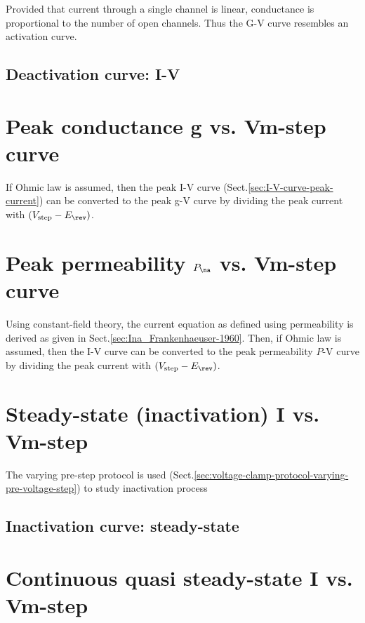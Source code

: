 Provided that current through a single channel is linear, conductance is
proportional to the number of open channels. Thus the G-V curve resembles an
activation curve.

\subsection{Deactivation curve: I-V}



\section{Peak conductance g vs. Vm-step curve}

If Ohmic law is assumed, then the peak I-V curve
(Sect.\ref{sec:I-V-curve-peak-current}) can be converted to the peak g-V curve
by dividing the peak current with $(V_\text{step} - E_\rev)$.

\section{Peak permeability $P_\na$ vs. Vm-step curve}

Using constant-field theory, the current equation as defined using permeability
is derived as given in Sect.\ref{sec:Ina_Frankenhaeuser-1960}.
Then, if Ohmic law is assumed, then the I-V curve can be converted to the peak
permeability $P$-V curve by dividing the peak current with
$(V_\text{step}-E_\rev)$.



\section{Steady-state (inactivation) I vs. Vm-step}
\label{sec:I-V-curve-steadystate-current}

The varying pre-step protocol is used
(Sect.\ref{sec:voltage-clamp-protocol-varying-pre-voltage-step}) to study
inactivation process

\subsection{Inactivation curve: steady-state}

\section{Continuous quasi steady-state I vs. Vm-step}
\label{sec:I-V-curve-quasi-steady-state}

